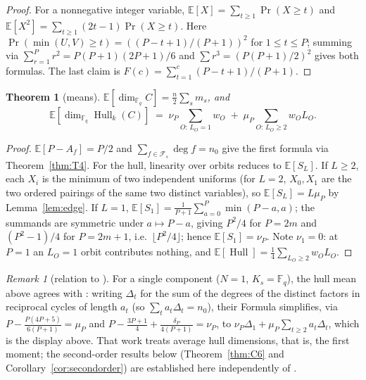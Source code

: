 \documentclass[10pt,journal,draftclsnofoot,onecolumn]{IEEEtran}
\newtheorem{theorem}{Theorem}[section]
\theoremstyle{definition}
\theoremstyle{remark}
\newtheorem*{remark}{Remark}
\newcommand{\Fq}{\mathbb{F}_q}
\newcommand{\Hull}{\operatorname{Hull}}
\newcommand{\E}{\mathbb{E}}
\begin{document}
\begin{proof}
For a nonnegative integer variable,
\(\E[X] = \sum_{t\ge1} \Pr(X \ge t)\) and
\(\E[X^2] = \sum_{t\ge1} (2t-1)\Pr(X\ge t)\).
Here \(\Pr(\min(U,V) \ge t) = ((P-t+1)/(P+1))^2\) for \(1 \le t \le P\);
summing via \(\sum_{r=1}^P r^2 = P(P+1)(2P+1)/6\) and
\(\sum r^3 = (P(P+1)/2)^2\) gives both formulas. The last claim is
\(F(c) = \sum_{t=1}^c (P-t+1)/(P+1)\).
\end{proof}

\begin{theorem}[means]\label{thm:C5}
\(\displaystyle \E[\dim_{\Fq} C] = \frac{n}{2} \sum_s m_s\), and
\[
\E[\dim_{\Fq} \Hull_k(C)] \;=\;
\nu_P \sum_{O:\, L_O = 1} w_O \;+\;
\mu_P \sum_{O:\, L_O \ge 2} w_O L_O .
\]
\end{theorem}

\begin{proof}
\(\E[P - A_f] = P/2\) and \(\sum_{f \in \mathcal{F}_s} \deg f = n_0\)
give the first formula via Theorem~\ref{thm:T4}. For the hull, linearity
over orbits reduces to \(\E[S_L]\). If \(L \ge 2\), each \(X_i\) is the
minimum of two independent uniforms (for \(L=2\), \(X_0, X_1\) are the
two ordered pairings of the same two distinct variables), so
\(\E[S_L] = L\mu_P\) by Lemma~\ref{lem:edge}. If \(L = 1\),
\(\E[S_1] = \frac{1}{P+1}\sum_{a=0}^P \min(P-a,a)\); the summands are
symmetric under \(a \mapsto P-a\), giving \(P^2/4\) for \(P = 2m\) and
\((P^2-1)/4\) for \(P = 2m+1\), i.e.\ \(\lfloor P^2/4 \rfloor\); hence
\(\E[S_1] = \nu_P\). Note \(\nu_1 = 0\): at \(P=1\) an \(L_O=1\) orbit
contributes nothing, and \(\E[\Hull] = \frac14 \sum_{L_O\ge2} w_O L_O\).
\end{proof}

\begin{remark}[relation to \cite{DP2025}]
For a single component (\(N = 1\), \(K_s = \Fq\)), the hull mean above
agrees with \cite[Theorem~3.3]{DP2025}: writing \(\Delta_t\) for the sum
of the degrees of the distinct factors in reciprocal cycles of length
\(a_t\) (so \(\sum_t a_t \Delta_t = n_0\)), their Formula simplifies,
via \(P - \frac{P(4P+5)}{6(P+1)} = \mu_P\) and
\(P - \frac{3P+1}{4} + \frac{\delta_P}{4(P+1)} = \nu_P\), to
\(\nu_P \Delta_1 + \mu_P \sum_{t \ge 2} a_t \Delta_t\), which is the
display above. That work treats average hull dimensions, that is, the first
moment; the second-order results below (Theorem~\ref{thm:C6} and
Corollary~\ref{cor:secondorder}) are established here independently of
\cite{DP2025}.
\end{remark}
\end{document}
